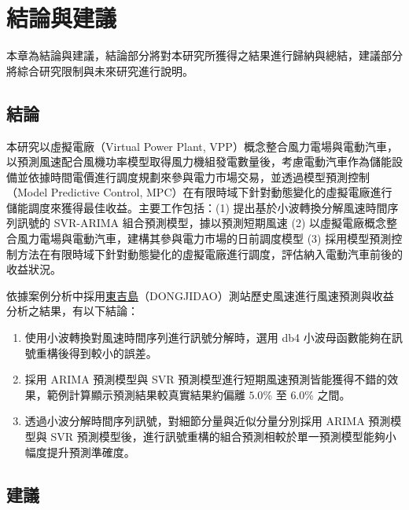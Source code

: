 
\chapter{結論與建議}

本章為結論與建議，結論部分將對本研究所獲得之結果進行歸納與總結，建議部分將綜合研究限制與未來研究進行說明。

\section{結論}

本研究以虛擬電廠（Virtual Power Plant, VPP）概念整合風力電場與電動汽車，以預測風速配合風機功率模型取得風力機組發電數量後，考慮電動汽車作為儲能設備並依據時間電價進行調度規劃來參與電力市場交易，並透過模型預測控制（Model Predictive Control, MPC）在有限時域下針對動態變化的虛擬電廠進行儲能調度來獲得最佳收益。主要工作包括：(1) 提出基於小波轉換分解風速時間序列訊號的 SVR-ARIMA 組合預測模型，據以預測短期風速 (2) 以虛擬電廠概念整合風力電場與電動汽車，建構其參與電力市場的日前調度模型 (3) 採用模型預測控制方法在有限時域下針對動態變化的虛擬電廠進行調度，評估納入電動汽車前後的收益狀況。

依據案例分析中採用\uline{東吉島}（DONGJIDAO）測站歷史風速進行風速預測與收益分析之結果，有以下結論：

\begin{enumerate}
  \item 使用小波轉換對風速時間序列進行訊號分解時，選用 db4 小波母函數能夠在訊號重構後得到較小的誤差。
  \item 採用 ARIMA 預測模型與 SVR 預測模型進行短期風速預測皆能獲得不錯的效果，範例計算顯示預測結果較真實結果約偏離 $5.0$\% 至 $6.0$\% 之間。
  \item 透過小波分解時間序列訊號，對細節分量與近似分量分別採用 ARIMA 預測模型與 SVR 預測模型後，進行訊號重構的組合預測相較於單一預測模型能夠小幅度提升預測準確度。
\end{enumerate}


\section{建議}


